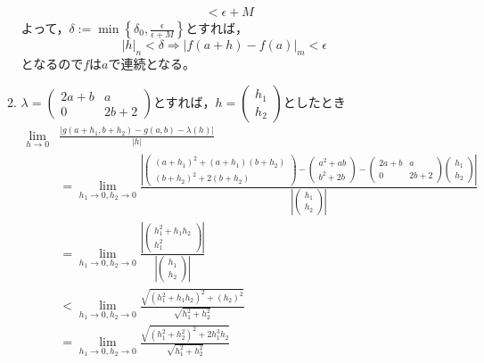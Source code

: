 \documentclass[dvipdfmx,a4j,10pt]{jsarticle}
\theoremstyle{mystyle1}
\theoremstyle{mystyle2}
\begin{document}
\begin{enumerate}
\begin{enumerate}
\[\begin{split}
            &<\epsilon+M
            \end{split}
            \]
            よって，$\displaystyle\delta:=\min\left\{\delta_0,\frac{\epsilon}{\epsilon+M}\right\}$とすれば，
            \[
            |h|_n<\delta \Rightarrow |f(a+h)-f(a)|_m<\epsilon
            \]
            となるので$f$は$a$で連続となる。
            \item $\lambda=\begin{pmatrix} 2a+b & a \\ 0 & 2b+2 \end{pmatrix}$とすれば，$h=\begin{pmatrix} h_1 \\ h_2 \end{pmatrix}$としたとき
            \[
            \begin{split}
            \lim_{h\to0}&\frac{|g(a+h_1,b+h_2)-g(a,b)-\lambda(h)|}{|h|}\\
            &=\lim_{h_1\to0,h_2\to0}\frac{\left|\begin{pmatrix} (a+h_1)^2+(a+h_1)(b+h_2) \\ (b+h_2)^2+2(b+h_2) \end{pmatrix}-\begin{pmatrix} a^2+ab \\ b^2+2b \end{pmatrix}-\begin{pmatrix} 2a+b & a \\ 0 & 2b+2 \end{pmatrix}\begin{pmatrix} h_1 \\ h_2 \end{pmatrix}\right|}{\left|\begin{pmatrix} h_1 \\ h_2 \end{pmatrix}\right|}\\
            &=\lim_{h_1\to0,h_2\to0}\frac{\left|\begin{pmatrix}h_1^2+h_1h_2 \\ h_1^2\end{pmatrix}\right|}{\left|\begin{pmatrix} h_1 \\ h_2 \end{pmatrix}\right|}\\
            &<\lim_{h_1\to0,h_2\to0}\frac{\sqrt{(h_1^2+h_1h_2)^2+(h_2)^2}}{\sqrt{h_1^2+h_2^2}}\\
            &=\lim_{h_1\to0,h_2\to0}\frac{\sqrt{(h_1^2+h_2^2)^2+2h_1^3h_2}}{\sqrt{h_1^2+h_2^2}}\\

\end{split}\]
\end{enumerate}
\end{enumerate}
\end{document}
